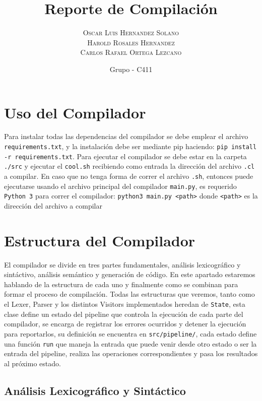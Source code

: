 \documentclass{article}
\title{Reporte de Compilaci\'on} %
\author{%
\textsc{Oscar Luis Hernandez Solano}\\ %
\textsc{Harold Rosales Hernandez} \\ %
\textsc{Carlos Rafael Ortega Lezcano}
}
\date{Grupo - C411} %
\begin{document}
\maketitle


\section{Uso del Compilador}

Para instalar todas las dependencias del compilador se debe emplear el archivo \verb|requirements.txt|, y la instalaci\'on debe ser mediante pip haciendo: \verb|pip install -r requirements.txt|. Para ejecutar el compilador se debe estar en la carpeta \verb|./src| y ejecutar el \verb|cool.sh| recibiendo como entrada la direcci\'on del archivo \verb|.cl| a compilar. En caso que no tenga forma de correr el archivo \verb|.sh|, entonces puede ejecutarse usando el archivo principal del compilador \verb|main.py|, es requerido \verb|Python 3| para correr el compilador: \verb|python3 main.py <path>| donde \verb|<path>| es la direcci\'on del archivo a compilar

\section{Estructura del Compilador}

El compilador se divide en tres partes fundamentales, an\'alisis lexicogr\'afico y sint\'activo, an\'alisis sem\'antico y generaci\'on de c\'odigo. En este apartado estaremos hablando de la estructura de cada uno y finalmente como se combinan para formar el proceso de compilaci\'on. Todas las estructuras que veremos, tanto como el Lexer, Parser y los distintos Visitors implementados heredan de \verb|State|, esta clase define un estado del pipeline que controla la ejecuci\'on de cada parte del compilador, se encarga de registrar los errores ocurridos y detener la ejecuci\'on para reportarlos, su definici\'on se encuentra en \verb|src/pipeline/|, cada estado define una funci\'on \verb|run| que maneja la entrada que puede venir desde otro estado o ser la entrada del pipeline, realiza las operaciones correspondientes y pasa los resultados al pr\'oximo estado.

\subsection{An\'alisis Lexicogr\'afico y Sint\'actico}
\end{document}
